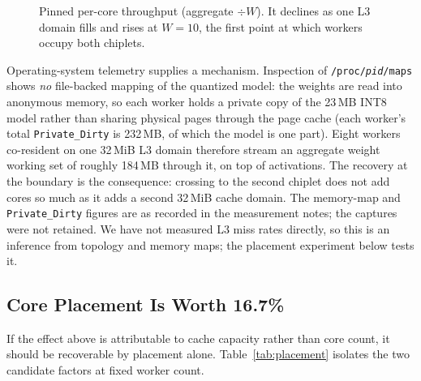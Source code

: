 \documentclass[conference]{IEEEtran}
\begin{document}
\begin{figure}[t]
\centering
{}
\caption{Pinned per-core throughput (aggregate $\div W$). It declines as one L3 domain fills and rises at $W{=}10$, the first point at which workers occupy both chiplets.}
\label{fig:percore}
\end{figure}

Operating-system telemetry supplies a mechanism. Inspection of \texttt{/proc/\textit{pid}/maps} shows \emph{no} file-backed mapping of the quantized model: the weights are read into anonymous memory, so each worker holds a private copy of the 23\,MB INT8 model rather than sharing physical pages through the page cache (each worker's total \texttt{Private\_Dirty} is 232\,MB, of which the model is one part). Eight workers co-resident on one 32\,MiB L3 domain therefore stream an aggregate weight working set of roughly 184\,MB through it, on top of activations. The recovery at the boundary is the consequence: crossing to the second chiplet does not add cores so much as it adds a second 32\,MiB cache domain. The memory-map and \texttt{Private\_Dirty} figures are as recorded in the measurement notes; the captures were not retained. We have not measured L3 miss rates directly, so this is an inference from topology and memory maps; the placement experiment below tests it.

\subsection{Core Placement Is Worth 16.7\%}
\label{sec:placement}

If the effect above is attributable to cache capacity rather than core count, it should be recoverable by placement alone. Table~\ref{tab:placement} isolates the two candidate factors at fixed worker count.
\end{document}
